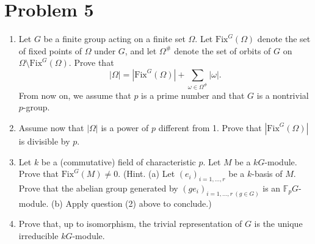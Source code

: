\documentclass[12pt, a4paper]{article}
\theoremstyle{remark}
\begin{document}
\section*{Problem 5}
\begin{enumerate}
    \item[(i)] Let $G$ be a finite group acting on a finite set $\Omega$. Let $\mathrm{Fix}^G(\Omega)$ denote the set of fixed points of $\Omega$ under $G$, and let $\Omega^\#$ denote the set of orbits of $G$ on $\Omega \setminus \mathrm{Fix}^G(\Omega)$. Prove that
    $$
    |\Omega| = |\mathrm{Fix}^G(\Omega)| + \sum_{\omega \in \Omega^\#} |\omega|.
    $$
    From now on, we assume that $p$ is a prime number and that $G$ is a nontrivial $p$-group.
    \item[(ii)] Assume now that $|\Omega|$ is a power of $p$ different from 1. Prove that $|\mathrm{Fix}^G(\Omega)|$ is divisible by $p$.
    \item[(iii)] Let $k$ be a (commutative) field of characteristic $p$. Let $M$ be a $kG$-module. Prove that $\mathrm{Fix}^G(M) \neq 0$. (Hint. (a) Let $(e_i)_{i=1,\dots,r}$ be a $k$-basis of $M$. Prove that the abelian group generated by $(g e_i)_{i=1,\dots,r \ (g \in G)}$ is an $\mathbb{F}_p G$-module. (b) Apply question (2) above to conclude.)
    \item[(iv)] Prove that, up to isomorphism, the trivial representation of $G$ is the unique irreducible $kG$-module.
\end{enumerate}
\end{document}
